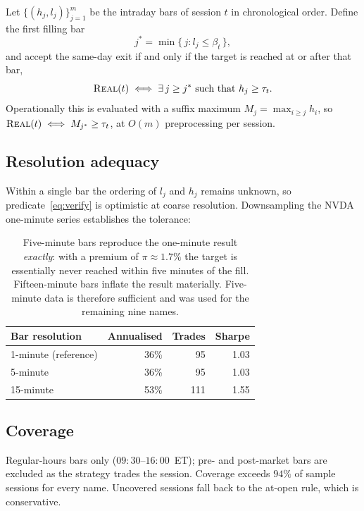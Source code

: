 \documentclass[11pt]{article}
\begin{document}
Let $\{(h_j,l_j)\}_{j=1}^{m}$ be the intraday bars of session $t$ in chronological order.
Define the first filling bar
\begin{equation}
j^{\ast} = \min\{\, j : l_j \le \beta_t \,\},
\end{equation}
and accept the same-day exit if and only if the target is reached at or after that bar,
\begin{equation}
\textsc{Real}(t) \iff \exists\, j \ge j^{\ast} \ \text{such that}\ h_j \ge \tau_t .
\label{eq:verify}
\end{equation}
Operationally this is evaluated with a suffix maximum $M_j=\max_{i\ge j} h_i$, so
$\textsc{Real}(t)\iff M_{j^\ast}\ge\tau_t$, at $O(m)$ preprocessing per session.

\subsection{Resolution adequacy}

Within a single bar the ordering of $l_j$ and $h_j$ remains unknown, so
predicate~\eqref{eq:verify} is optimistic at coarse resolution. Downsampling the NVDA
one-minute series establishes the tolerance:

\begin{table}[H]\centering\small
\renewcommand{\arraystretch}{1.15}
\begin{tabular}{lrrr}
\toprule
\textbf{Bar resolution} & \textbf{Annualised} & \textbf{Trades} & \textbf{Sharpe}\\
\midrule
1-minute (reference) & 36\% & 95 & 1.03\\
\rowcolor{bckeep} 5-minute & 36\% & 95 & 1.03\\
15-minute & 53\% & 111 & 1.55\\
\bottomrule
\end{tabular}
\caption*{\footnotesize Five-minute bars reproduce the one-minute result \emph{exactly}: with a
premium of $\pi\!\approx\!1.7\%$ the target is essentially never reached within five minutes of
the fill. Fifteen-minute bars inflate the result materially. Five-minute data is therefore
sufficient and was used for the remaining nine names.}
\end{table}

\subsection{Coverage}

Regular-hours bars only ($09{:}30$--$16{:}00$~ET); pre- and post-market bars are excluded as
the strategy trades the session. Coverage exceeds $94\%$ of sample sessions for every name.
Uncovered sessions fall back to the at-open rule, which is conservative.
\end{document}
